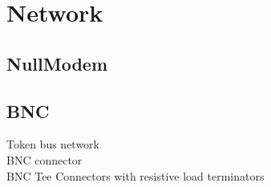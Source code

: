 \section{Network}
\subsection{NullModem}
\subsection{BNC}
Token bus network\\
BNC connector\\
BNC Tee Connectors with resistive load terminators\\
